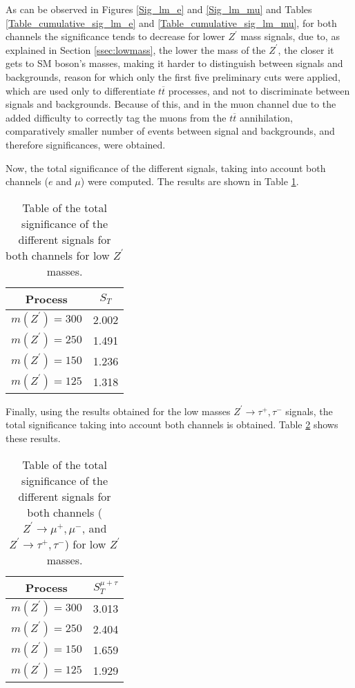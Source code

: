 As can be observed in Figures \ref{Sig_lm_e} and \ref{Sig_lm_mu} and Tables \ref{Table_cumulative_sig_lm_e} and \ref{Table_cumulative_sig_lm_mu}, for both channels the significance tends to decrease for lower $Z^{\prime}$ mass signals, due to, as explained in Section \ref{ssec:lowmass}, the lower the mass of the $Z^{\prime}$, the closer it gets to SM boson's masses, making it harder to distinguish between signals and backgrounds, reason for which only the first five preliminary cuts were applied, which are used only to differentiate $t\overline t$ processes, and not to discriminate between signals and backgrounds. Because of this, and in the muon channel due to the added difficulty to correctly tag the muons from the $t\overline t$ annihilation, comparatively smaller number of events between signal and backgrounds, and therefore significances, were obtained.

Now, the total significance of the different signals, taking into account both channels ($e$ and $\mu$) were computed. The results are shown in Table \ref{Table_total_sig_lm}.

\begin{table}[ht!]
\centering
\caption{Table of the total significance of the different signals for both channels for low $Z^{\prime}$ masses.}
\label{Table_total_sig_lm}
\begin{tabular}{c|c}
\hline
\hline
Process & $S_T$ \\
\hline
$m(Z^{\prime}) = 300$ & 2.002 \\
$m(Z^{\prime}) = 250$ & 1.491 \\
$m(Z^{\prime}) = 150$ & 1.236 \\
$m(Z^{\prime}) = 125$ & 1.318 \\
\hline
\hline
\end{tabular}
\end{table}

Finally, using the results obtained for the low masses $Z^{\prime} \rightarrow \tau^+, \tau^-$ signals, the total significance taking into account both channels is obtained. Table \ref{Table_total_cumulative_sig_lm} shows these results.

\begin{table}[ht!]
\centering
\caption{Table of the total significance of the different signals for both channels ($Z^{\prime} \rightarrow \mu^+, \mu^-$, and $Z^{\prime} \rightarrow \tau^+, \tau^-$) for low $Z^{\prime}$ masses.}
\label{Table_total_cumulative_sig_lm}
\begin{tabular}{c|c}
\hline
\hline
Process & $S_T^{\mu + \tau}$ \\
\hline
$m(Z^{\prime}) = 300$ & 3.013 \\
$m(Z^{\prime}) = 250$ & 2.404 \\
$m(Z^{\prime}) = 150$ & 1.659 \\
$m(Z^{\prime}) = 125$ & 1.929 \\
\hline
\hline
\end{tabular}
\end{table}

